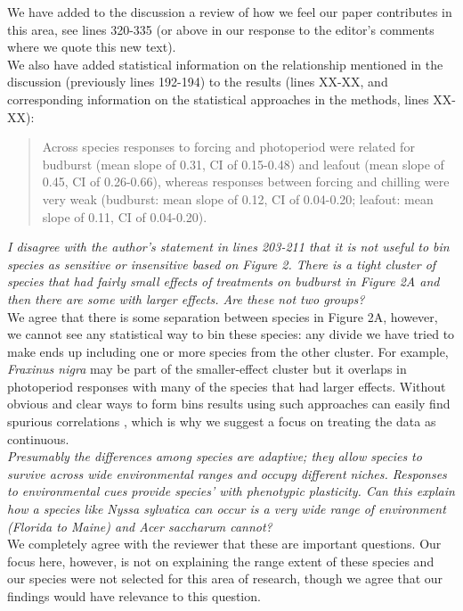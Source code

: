 \documentclass[11pt,a4paper]{article}
\begin{document}
We have added to the discussion a review of how we feel our paper contributes in this area, see lines 320-335 (or above in our response to the editor's comments where we quote this new text).\\

We also have added statistical information on the relationship mentioned in the discussion (previously lines 192-194) to the results (lines XX-XX, and corresponding information on the statistical approaches in the methods, lines XX-XX):
\begin{quote}
Across species responses to forcing and photoperiod were related for budburst (mean slope of 0.31, CI of 0.15-0.48) and leafout (mean slope of 0.45, CI of 0.26-0.66), whereas responses between forcing and chilling were very weak (budburst: mean slope of 0.12, CI of 0.04-0.20; leafout: mean slope of 0.11, CI of 0.04-0.20). 
\end{quote}

\emph{I disagree with the author’s statement in lines 203-211 that it is not useful to bin species as sensitive or
insensitive based on Figure 2. There is a tight cluster of species that had fairly small
effects of treatments on budburst in Figure 2A and then there are some with larger effects.
Are these not two groups?} \\

We agree that there is some separation between species in Figure 2A, however, we cannot see any statistical way to bin these species: any divide we have tried to make ends up including one or more species from the other cluster. For example, \emph{Fraxinus nigra} may be part of the smaller-effect cluster but it overlaps in photoperiod responses with many of the species that had larger effects. Without obvious and clear ways to form bins results using such approaches can easily find spurious correlations \citep[e.g.,][]{gelmanbinning}, which is why we suggest a focus on treating the data as continuous. \\

\emph{Presumably the differences among species are adaptive; they allow
species to survive across wide environmental ranges and occupy different niches.  Responses
to environmental cues provide species’ with phenotypic plasticity.  Can this explain how a
species like Nyssa sylvatica can occur is a very wide range of environment (Florida to Maine)
and Acer saccharum cannot?}\\

We completely agree with the reviewer that these are important questions. Our focus here, however, is not on explaining the range extent of these species and our species were not selected for this area of research, though we agree that our findings would have relevance to this question. \\
\end{document}
